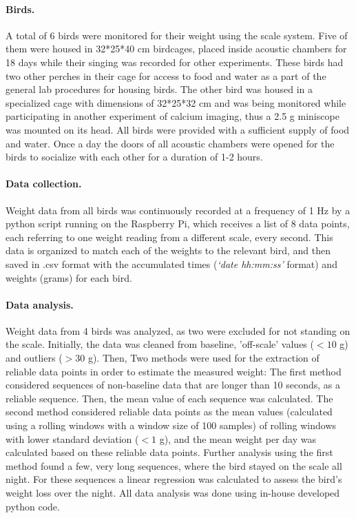 \documentclass{article}
\begin{document}
\paragraph{Birds.}
A total of 6 birds were monitored for their weight using the scale system. Five of them were housed in 32*25*40 cm birdcages, placed inside acoustic chambers for 18 days while their singing was recorded for other experiments. These birds had two other perches in their cage for access to food and water as a part of the general lab procedures for housing birds. The other bird was housed in a specialized cage with dimensions of 32*25*32 cm and was being monitored while participating in another experiment of calcium imaging, thus a 2.5 g miniscope was mounted on its head. All birds were provided with a sufficient supply of food and water. Once a day the doors of all acoustic chambers were opened for the birds to socialize with each other for a duration of 1-2 hours. 

\paragraph{Data collection.}
Weight data from all birds was continuously recorded at a frequency of 1 Hz by a python script running on the Raspberry Pi, which receives a list of 8 data points, each referring to one weight reading from a different scale, every second. This data is organized to match each of the weights to the relevant bird, and then saved in .csv format with the accumulated times (\textit{‘date hh:mm:ss’} format) and weights (grams) for each bird. 

\paragraph{Data analysis.}
Weight data from 4 birds was analyzed, as two were excluded for not standing on the scale. Initially, the data was cleaned from baseline, 'off-scale' values ($ <10$ g) and outliers ($ >30$ g). Then, Two methods were used for the extraction of reliable data points in order to estimate the measured weight: The first method considered sequences of non-baseline data that are longer than 10 seconds, as a reliable sequence. Then, the mean value of each sequence was calculated. The second method considered reliable data points as the mean values (calculated using a rolling windows with a window size of 100 samples) of rolling windows with lower standard deviation ($ <1$ g), and the mean weight per day was calculated based on these reliable data points. Further analysis using the first method found a few, very long sequences, where the bird stayed on the scale all night. For these sequences a linear regression was calculated to assess the bird's weight loss over the night. All data analysis was done using in-house developed python code.
\end{document}
